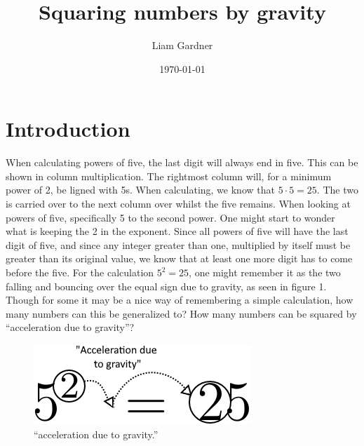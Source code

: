 \documentclass[a4paper, 12pt]{article}
\begin{document}
\author{Liam Gardner}
\title{Squaring numbers by gravity}
\date{\today}
\maketitle

\newcommand{\floor}[1]{\lfloor#1\rfloor}
\newcommand{\Mod}[2]{({#1}\operatorname{ mod } {#2})}

\section{Introduction}

When calculating powers of five, the last digit will always end in five. This can be shown in column multiplication. The rightmost column will, for a minimum power of 2, be ligned with 5s. When calculating, we know that $5\cdot5 = 25$. The two is carried over to the next column over whilst the five remains. When looking at powers of five, specifically 5 to the second power. One might start to wonder what is keeping the 2 in the exponent. Since all powers of five will have the last digit of five, and since any integer greater than one, multiplied by itself must be greater than its original value, we know that at least one more digit has to come before the five. For the calculation $5^2=25$, one might remember it as the two falling and bouncing over the equal sign due to gravity, as seen in figure 1. Though for some it may be a nice way of remembering a simple calculation, how many numbers can this be generalized to? How many numbers can be squared by ``acceleration due to gravity''?
\newline

\begin{figure}[h]
	\includegraphics[scale=0.7]{Figures/Figure1.png}
	\centering
	\caption{``acceleration due to gravity.''}
	\label{fig:gravity}
\end{figure}
\FloatBarrier
\end{document}
